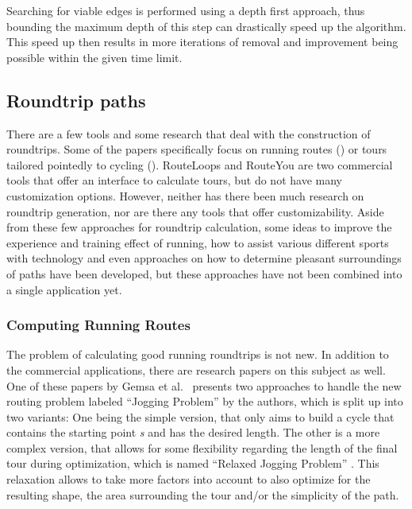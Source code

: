 Searching for viable edges is performed using a depth first approach, thus bounding the maximum depth of this step can drastically speed up the algorithm.
This speed up then results in more iterations of removal and improvement being possible within the given time limit.



\subsection{Roundtrip paths}
\label{subsec:Roudtrip}
There are a few tools and some research that deal with the construction of roundtrips.
Some of the papers specifically focus on running routes (\cite{gemsa_efficient_2013, pajor_algorithm_2013}) or tours tailored pointedly to cycling (\cite{ehrgott_bi-objective_2012, verbeeck_extension_2014}).
RouteLoops and RouteYou are two commercial tools that offer an interface to calculate tours, but do not have many customization options.
However, neither has there been much research on roundtrip generation, nor are there any tools that offer customizability.
Aside from these few approaches for roundtrip calculation, some ideas to improve the experience and training effect of running, how to assist various different sports with technology and even approaches on how to determine pleasant surroundings of paths have been developed, but these approaches have not been combined into a single application yet.



\subsubsection{Computing Running Routes}
\label{subsubsec:runningRoutes}

The problem of calculating good running roundtrips is not new.
In addition to the commercial applications, there are research papers on this subject as well.
One of these papers by Gemsa et al.\ \cite{gemsa_efficient_2013} presents two approaches to handle the new routing problem labeled \enquote{Jogging Problem} by the authors, which is split up into two variants: 
One being the simple version, that only aims to build a cycle that contains the starting point \textit{s} and has the desired length.
The other is a more complex version, that allows for some flexibility regarding the length of the final tour during optimization, which is named \enquote{Relaxed Jogging Problem} \cite{gemsa_efficient_2013}. 
This relaxation allows to take more factors into account to also optimize for the resulting shape, the area surrounding the tour and/or the simplicity of the path. 


